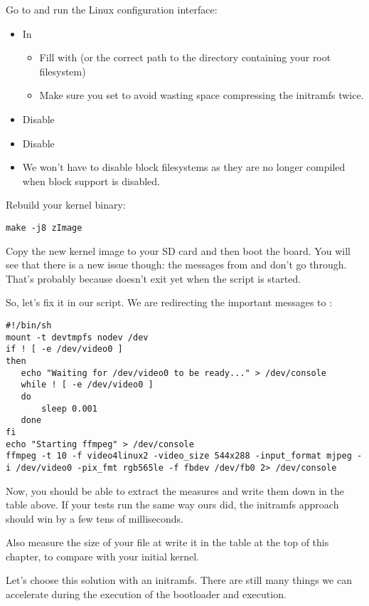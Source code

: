 Go to  and run the Linux
configuration interface:

\begin{itemize}
  \item In 
  \begin{itemize}
     \item Fill  with
 (or the correct path to the directory
containing your root filesystem)
     \item Make sure you set 
	   to avoid wasting space compressing the initramfs twice.
  \end{itemize}
  \item Disable 
  \item Disable 
  \item We won't have to disable block filesystems as they are no longer
compiled when block support is disabled.
\end{itemize}

Rebuild your kernel binary:
\begin{verbatim}
make -j8 zImage
\end{verbatim}

Copy the new kernel image to your SD card and then boot the board. You
will see that there is a new issue though: the messages from 
and  don't go through. That's probably because
 doesn't exit yet when the script is started.

So, let's fix it in our script. We are redirecting the important
messages to :

{\scriptsize
\begin{verbatim}
#!/bin/sh
mount -t devtmpfs nodev /dev
if ! [ -e /dev/video0 ]
then
   echo "Waiting for /dev/video0 to be ready..." > /dev/console
   while ! [ -e /dev/video0 ]
   do
       sleep 0.001
   done
fi
echo "Starting ffmpeg" > /dev/console
ffmpeg -t 10 -f video4linux2 -video_size 544x288 -input_format mjpeg -i /dev/video0 -pix_fmt rgb565le -f fbdev /dev/fb0 2> /dev/console
\end{verbatim}
}

Now, you should be able to extract the measures and write them down in
the table above. If your tests run the same way ours did, the
initramfs approach should win by a few tens of milliseconds.

Also measure the size of your  file at write it in the
table at the top of this chapter, to compare with your initial kernel.

Let's choose this solution with an initramfs. There are still many things we can
accelerate during the execution of the bootloader and execution.
